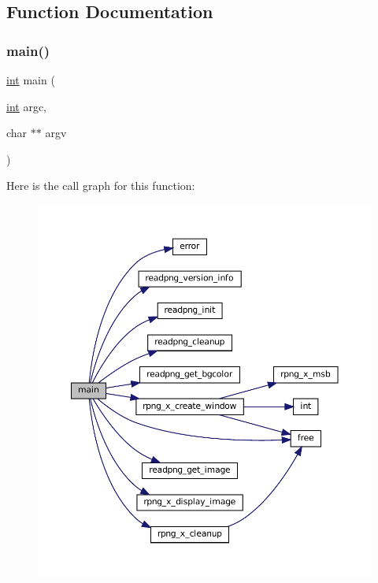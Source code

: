 \subsection{Function Documentation}
\mbox{\label{rpng-x_8c_a3c04138a5bfe5d72780bb7e82a18e627}} 
\subsubsection{\texorpdfstring{main()}{main()}}
{\footnotesize\ttfamily \mbox{\hyperlink{ioapi_8h_a787fa3cf048117ba7123753c1e74fcd6}{int}} main (\begin{DoxyParamCaption}\item[{\mbox{\hyperlink{ioapi_8h_a787fa3cf048117ba7123753c1e74fcd6}{int}}}]{argc,  }\item[{char $\ast$$\ast$}]{argv }\end{DoxyParamCaption})}

Here is the call graph for this function\+:
\nopagebreak
\begin{figure}[H]
\begin{center}
\leavevmode
\includegraphics[width=350pt]{rpng-x_8c_a3c04138a5bfe5d72780bb7e82a18e627_cgraph}
\end{center}
\end{figure}
\mbox{\label{rpng-x_8c_ac718542858c367c8ecb211043ca7d561}} 
